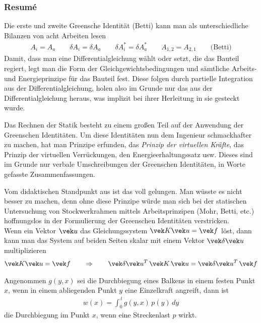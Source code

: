 \subsubsection{Resum\'{e}}
Die erste und zweite Greensche Identit\"{a}t (Betti) kann man als unterschiedliche Bilanzen von acht Arbeiten lesen
\begin{align}
A_i = A_a \qquad \delta A_i = \delta A_a \qquad \delta A_i^* = \delta A_a^* \qquad A_{1,2} = A_{2,1} \qquad \text{(Betti)}
\end{align}
Damit, dass man eine Differentialgleichung w\"{a}hlt oder setzt, die das Bauteil regiert, legt man die Form der Gleichgewichtsbedingungen und s\"{a}mtliche Arbeits- und Energieprinzipe f\"{u}r das Bauteil fest. Diese folgen durch partielle Integration aus der Differentialgleichung, holen also im Grunde nur das aus der Differentialgleichung heraus, was implizit bei ihrer Herleitung in sie gesteckt wurde.

Das Rechnen der Statik besteht zu einem gro{\ss}en Teil auf der Anwendung der Greenschen Identit\"{a}ten. Um diese Identit\"{a}ten nun dem Ingenieur schmackhafter zu machen, hat man Prinzipe erfunden, das {\em Prinzip der virtuellen Kr\"{a}fte\/}, das Prinzip der virtuellen Verr\"{u}ckungen, den Energieerhaltungssatz usw. Dieses sind im Grunde nur verbale Umschreibungen der Greenschen Identit\"{a}ten, in Worte gefasste Zusammenfassungen.

Vom didaktischen Standpunkt aus ist das voll gelungen. Man w\"{u}sste es nicht besser zu machen, denn ohne diese Prinzipe w\"{u}rde man sich bei der statischen Untersuchung von Stockwerkrahmen mittels Arbeitsprinzipen (Mohr, Betti, etc.) hoffnungslos in der Formulierung der Greenschen Identit\"{a}ten verstricken.
\\

Wenn ein Vektor $\vek u $ das Gleichungssystem $\vek K\vek u = \vek f$ l\"{o}st, dann kann man das System auf beiden Seiten skalar mit einem Vektor $\vek \delta \vek u$ multiplizieren
\begin{align}
\vek K\vek u = \vek f \qquad \Rightarrow \qquad \vek \delta\vek u^T\,\vek K\,\vek u = \vek \delta \vek u^T\,\vek f
\end{align}




Angenommen $g(y,x)$ sei die Durchbiegung eines Balkens in einem festen Punkt $x$, wenn in einem abliegenden Punkt $y$ eine Einzelkraft angreift, dann ist
\begin{align}
w(x) = \int_0^{\,l} g(y,x)\,p(y)\,dy
\end{align}
die Durchbiegung im Punkt $x$, wenn eine Streckenlast $p$ wirkt.

